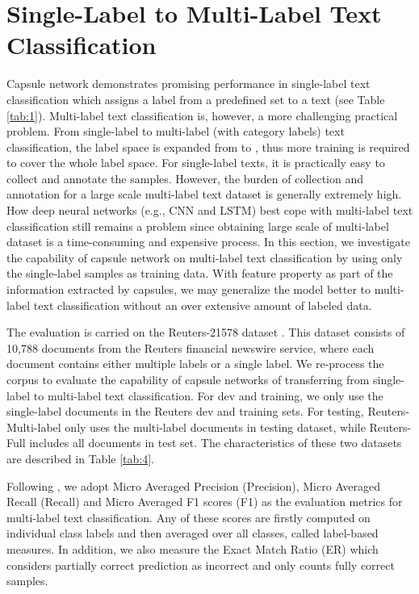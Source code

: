 \documentclass[11pt]{article}
\begin{document}
\section{Single-Label to Multi-Label Text Classification}
Capsule network demonstrates promising performance in single-label text classification which assigns a label from a predefined set to a text  (see Table  \ref{tab:1}).  Multi-label text classification is, however, a more challenging practical problem.
From single-label to multi-label (with  category labels) text classification, the label space is expanded from  to , thus more training is required to cover the whole label space. For single-label texts, it is practically easy to collect and annotate the samples. However, the burden of collection and annotation for a large scale multi-label text dataset is generally extremely high. 
How deep neural networks (e.g., CNN and LSTM) best cope with multi-label text classification still remains a problem since obtaining large scale of multi-label dataset is a time-consuming and expensive process. 
In this section, we investigate the capability of capsule network on multi-label text classification by using only the single-label samples as training data.
With feature property as part of the information extracted by capsules, we may generalize the model better to multi-label text classification without an over extensive amount of labeled data.  

The evaluation is carried on the Reuters-21578 dataset \cite{LEWIS92b}. This dataset consists of 10,788 documents from the Reuters financial newswire service, where each document contains either multiple labels or a single label. We re-process the corpus to evaluate the capability of capsule networks of transferring from single-label to multi-label text classification. 
For dev and training, we only use the single-label documents in the Reuters dev and training sets. For testing, Reuters-Multi-label only uses the multi-label documents in testing dataset, while Reuters-Full includes all documents in test set.
The characteristics of these two datasets are described in Table \ref{tab:4}.

Following \cite{sorower2010literature}, we adopt Micro Averaged Precision (Precision), Micro Averaged Recall (Recall) and Micro Averaged F1 scores (F1) as the evaluation metrics for multi-label text classification. Any of these scores are firstly computed on individual class labels 
and then averaged over all classes, called label-based measures. 
In addition, we also measure the Exact Match Ratio (ER) which considers partially correct prediction as incorrect and only counts fully correct samples.
\end{document}
